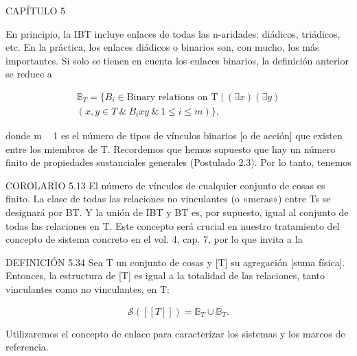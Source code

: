 \begin{justifying}
    \bigskip

    \begin{center}
        CAPÍTULO 5
    \end{center}

    
    En principio, la IBT incluye enlaces de todas las n-aridades: diádicos, triádicos, etc.
    En la práctica, los enlaces diádicos o binarios son, con mucho, los más
    importantes. Si solo se tienen en cuenta los enlaces binarios, la definición anterior
    se reduce a

    \begin{center}
        \[
        \begin{gathered}
        \mathbb{B}_{T} = \{ B_{i} \in \text{Binary relations on T} \mid (\exists x)(\exists y) \\
        (x, y \in T \ \& \ B_{i}xy \ \& \ 1 \le i \le m) \},
        \end{gathered}
        \]
    \end{center}

    donde m ~ 1 es el número de tipos de vínculos binarios [o de acción] que existen
    entre los miembros de T.
    Recordemos que hemos supuesto que hay un número finito de propiedades sustanciales generales
    (Postulado 2.3). Por lo tanto, tenemos

    COROLARIO 5.13 El número de vínculos de cualquier conjunto de cosas es finito.
    La clase de todas las relaciones no vinculantes (o «meras») entre Ts se
    designará por BT. Y la unión de IBT y BT es, por supuesto, igual al conjunto de
    todas las relaciones en T. Este concepto será crucial en nuestro tratamiento del
    concepto de sistema concreto en el vol. 4, cap. 7, por lo que invita a la
    
    DEFINICIÓN 5.34 Sea T un conjunto de cosas y [T] su agregación
    [suma física]. Entonces, la estructura de [T] es igual a la totalidad de las relaciones,
    tanto vinculantes como no vinculantes, en T:

    \begin{center}
        \[ \mathcal{S}([[T]]) = \mathbb{B}_{T} \cup \overline{\mathbb{B}_{T}}. \]
    \end{center}

    Utilizaremos el concepto de enlace para caracterizar los sistemas y los
    marcos de referencia.


\end{justifying}

